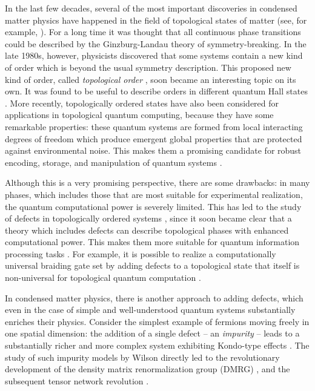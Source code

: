 
In the last few decades, several of the most important discoveries in condensed matter physics have happened in the field of topological states of matter (see, for example, \cite{Wen07,NSSFD08,HK10,QZ11}). For a long time it was thought that all continuous phase transitions could be described by the Ginzburg-Landau theory of symmetry-breaking. In the late 1980s, however, physicists discovered that some systems contain a new kind of order which is beyond the usual symmetry description. This proposed new kind of order, called \emph{topological order} \cite{Wen90}, soon became an interesting topic on its own. It was found to be useful to describe orders in different quantum Hall states \cite{WN90}. More recently, topologically ordered states have also been considered for applications in topological quantum computing, because they have some remarkable properties: these quantum systems are formed from local interacting degrees of freedom which produce emergent global properties that are protected against environmental noise. This makes them a promising candidate for robust encoding, storage, and manipulation of quantum systems \cite{DKLP2002,Kit03,NSSFD08,Ter15,PY15,BLPSW16}.

Although this is a very promising perspective, there are some drawbacks: in many phases, which includes those that are most suitable for experimental realization, the quantum computational power is severely limited. This has led to the study of defects in topologically ordered systems \cite{RH07,Bombin2010,KK12,FSV13,BJQ13b,BASP14,JPSV15,DIP16,CCW16,BBD17,CCW17b,CCW17,BLKW17,KPEB18,ET19}, since it soon became clear that a theory which includes defects can describe topological phases with enhanced computational power. This makes them more suitable for quantum information processing tasks \cite{Freedman1998,FLW02b,FLW02,FKLW02}. For example, it is possible to realize a computationally universal braiding gate set by adding defects to a topological state that itself is non-universal for topological quantum computation \cite{BJQ13}. 

In condensed matter physics, there is another approach to adding defects, which even in the case of simple and well-understood quantum systems substantially enriches their physics. Consider the simplest example of fermions moving freely in one spatial dimension: the addition of a single defect -- an \emph{impurity} -- leads to a substantially richer and more complex system exhibiting Kondo-type effects \cite{andersonLocalizedMagneticStates1961,hewsonKondoProblemHeavy1997}. The study of such impurity models by Wilson \cite{wilsonRenormalizationGroupCritical1975} directly led to the revolutionary development of the density matrix renormalization group (DMRG) \cite{whiteDensityMatrixFormulation1992}, and the subsequent tensor network revolution \cite{bridgemanHandwavingInterpretiveDance2017}.

